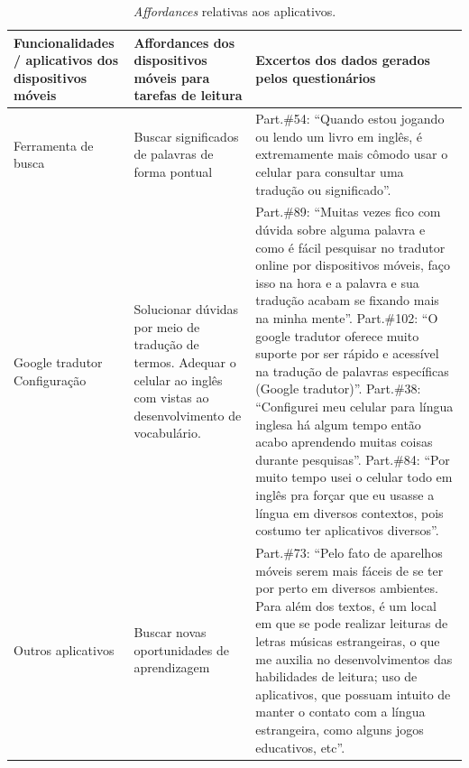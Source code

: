\documentclass[portuguese]{textolivre}
\begin{document}
\begin{table}[h]
\small
\centering
\begin{threeparttable}
\caption{\emph{Affordances} relativas aos aplicativos.}
\label{tab03}
\begin{tabular}{p{3cm}p{4cm}p{6.6cm}}
\toprule
Funcionalidades / aplicativos dos dispositivos móveis & Affordances dos dispositivos móveis para tarefas de leitura & Excertos dos dados gerados pelos questionários \\
\midrule
Ferramenta de busca & Buscar significados de palavras de forma pontual & Part.\#54: “Quando estou jogando ou lendo um livro em inglês, é extremamente mais cômodo usar o celular para consultar uma tradução ou significado”. \\
Google tradutor \newline Configuração & Solucionar dúvidas por meio de tradução de termos. \newline Adequar o celular ao inglês com vistas ao desenvolvimento de vocabulário. & Part.\#89: “Muitas vezes fico com dúvida sobre alguma palavra e como é fácil pesquisar no tradutor online por dispositivos móveis, faço isso na hora e a palavra e sua tradução acabam se fixando mais na minha mente”. \newline 
Part.\#102: “O google tradutor oferece muito suporte por ser rápido e acessível na tradução de palavras específicas (Google tradutor)”.\newline 
Part.\#38: “Configurei meu celular para língua inglesa há algum tempo	então acabo aprendendo muitas coisas durante pesquisas”. \newline
Part.\#84: “Por muito tempo usei o celular todo em inglês pra forçar que \newline	eu usasse a língua em diversos contextos, pois costumo ter aplicativos diversos”.  \\
Outros aplicativos & Buscar novas oportunidades de aprendizagem & Part.\#73: “Pelo fato de aparelhos móveis serem mais fáceis de se ter por perto em diversos ambientes. Para além dos textos, é um local em que se pode realizar leituras de letras músicas estrangeiras, o que me auxilia no desenvolvimentos das habilidades de leitura; uso de aplicativos, que possuam intuito de manter o contato com a língua estrangeira, como alguns jogos educativos, etc”. \\
\bottomrule
\end{tabular}%
\end{threeparttable}
\end{table}
\end{document}

